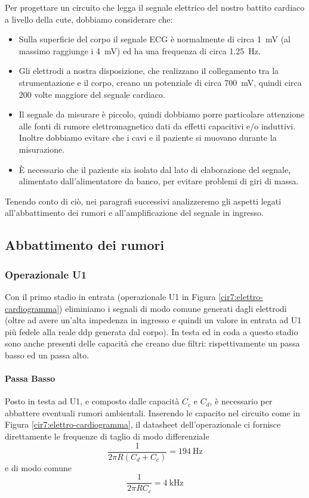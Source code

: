 Per progettare un circuito che legga il segnale elettrico del nostro battito cardiaco a livello della cute, dobbiamo considerare che:
\begin{itemize} [noitemsep]
	\item Sulla superficie del corpo il segnale ECG è normalmente di circa \SI{1}{mV} (al massimo raggiunge i \SI{4}{mV}) ed ha una frequenza di circa \SI{1.25}{\Hz}.
	\item Gli elettrodi a nostra disposizione, che realizzano il collegamento tra la strumentazione e il corpo, creano un potenziale di circa \SI{700}{\mV}, quindi circa \num{200} volte maggiore del segnale cardiaco.
	\item Il segnale da misurare è piccolo, quindi dobbiamo porre particolare attenzione alle fonti di rumore elettromagnetico dati da effetti capacitivi e/o induttivi. Inoltre dobbiamo evitare che i cavi e il paziente si muovano durante la misurazione.
	\item È necessario che il paziente sia isolato dal lato di elaborazione del segnale, alimentato dall'alimentatore da banco, per evitare problemi di giri di massa.
\end{itemize}

Tenendo conto di ciò, nei paragrafi successivi analizzeremo gli aspetti legati all'abbattimento dei rumori e all'amplificazione del segnale in ingresso.

\subsection{Abbattimento dei rumori}

\subsubsection*{Operazionale U1}

Con il primo stadio in entrata (operazionale U1 in Figura \ref{cir7:elettro-cardiogramma}) eliminiamo i segnali di modo comune generati dagli elettrodi (oltre ad avere un'alta impedenza in ingresso e quindi un valore in entrata ad U1 più fedele alla reale ddp generata dal corpo). In testa ed in coda a questo stadio sono anche presenti delle capacità che creano due filtri: rispettivamente un passa basso ed un passa alto.

\paragraph*{Passa Basso}
Posto in testa ad U1, e composto dalle capacità $C_c$ e $C_d$, è necessario per abbattere eventuali rumori ambientali. Inserendo le capacito nel circuito come in Figura \ref{cir7:elettro-cardiogramma}, il datasheet dell'operazionale ci fornisce direttamente le frequenze di taglio di modo differenziale
\begin{equation*}
	\frac{1}{2 \pi R ( C_d + C_c ) } = \SI{194}{\Hz}
\end{equation*}
e di modo comune
\begin{equation*}
	\frac{1}{2 \pi R C_c} = \SI{4}{\kHz}
\end{equation*}

